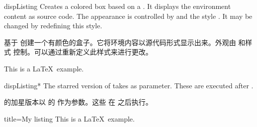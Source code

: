 \begin{docEnvironment}{dispListing}{}
Creates a colored box based on a .
It displays the environment content as source code.
The appearance is controlled by 
and the style . It may be
changed by redefining this style.

基于  创建一个有颜色的盒子。它将环境内容以源代码形式显示出来。外观由  和样式  控制。可以通过重新定义此样式来进行更改。
\begin{dispExample}
\begin{dispListing}
This is a \LaTeX\ example.
\end{dispListing}
\end{dispExample}
\end{docEnvironment}

\begin{docEnvironment}{dispListing*}{}
The starred version of  takes  
as parameter. These  are executed after .

 的加星版本以  的  作为参数。这些  在  之后执行。
\begin{dispExample}
\begin{dispListing*}{title=My listing}
This is a \LaTeX\ example.
\end{dispListing*}
\end{dispExample}
\end{docEnvironment}